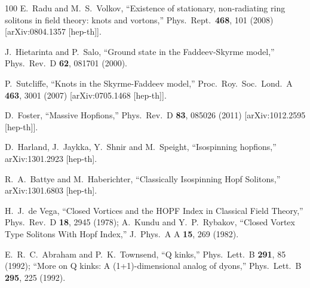 \documentclass[aps,prd,preprint,
superscriptaddress]{revtex4}
\newcommand {\1}[1]{\frac{1}{#1}}
\newcommand {\2}[1]{\frac{i}{#1}}
\begin{document}
\begin{thebibliography}{100}
  E.~Radu and M.~S.~Volkov,
  ``Existence of stationary, non-radiating ring solitons in field theory: knots and vortons,''  Phys.\ Rept.\  {\bf 468}, 101 (2008)  [arXiv:0804.1357 [hep-th]].  %

  J.~Hietarinta and P.~Salo,
  ``Ground state in the Faddeev-Skyrme model,''  Phys.\ Rev.\ D {\bf 62}, 081701 (2000).  %

  P.~Sutcliffe,
  ``Knots in the Skyrme-Faddeev model,''  Proc.\ Roy.\ Soc.\ Lond.\ A {\bf 463}, 3001 (2007)  [arXiv:0705.1468 [hep-th]].  %

  D.~Foster,
  ``Massive Hopfions,''  Phys.\ Rev.\ D {\bf 83}, 085026 (2011)  [arXiv:1012.2595 [hep-th]].  %

  D.~Harland, J.~Jaykka, Y.~Shnir and M.~Speight,
  ``Isospinning hopfions,''  arXiv:1301.2923 [hep-th].  %

  R.~A.~Battye and M.~Haberichter,
  ``Classically Isospinning Hopf Solitons,''  arXiv:1301.6803 [hep-th].  %

  H.~J.~de Vega,
  ``Closed Vortices and the HOPF Index in Classical Field Theory,''  
Phys.\ Rev.\ D {\bf 18}, 2945 (1978);  %
  A.~Kundu and Y.~P.~Rybakov,
  ``Closed Vortex Type Solitons With Hopf Index,''  
J.\ Phys.\ A A {\bf 15}, 269 (1982).  %

  E.~R.~C.~Abraham and P.~K.~Townsend,
  ``Q kinks,''  
Phys.\ Lett.\ B {\bf 291}, 85 (1992);  %
  ``More on Q kinks: A (1+1)-dimensional analog of dyons,''  
Phys.\ Lett.\ B {\bf 295}, 225 (1992).  %


\end{thebibliography}
\end{document}
